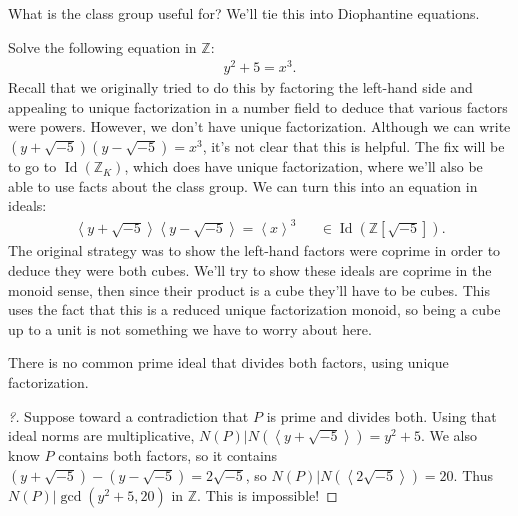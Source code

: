 \begin{remark}

What is the class group useful for? We'll tie this into Diophantine
equations.

\end{remark}

\begin{example}

Solve the following equation in \({\mathbb{Z}}\):
\begin{align*}
y^2 + 5 = x^3
.\end{align*}
Recall that we originally tried to do this by factoring the left-hand
side and appealing to unique factorization in a number field to deduce
that various factors were powers. However, we don't have unique
factorization. Although we can write
\(( y + \sqrt{-5} ) (y - \sqrt{-5} ) = x^3\), it's not clear that this
is helpful. The fix will be to go to
\(\operatorname{Id}({\mathbb{Z}}_K)\), which does have unique
factorization, where we'll also be able to use facts about the class
group. We can turn this into an equation in ideals:
\begin{align*}
\left\langle{ y + \sqrt{-5} }\right\rangle  
\left\langle{ y - \sqrt{-5} }\right\rangle  
= 
\left\langle{ x }\right\rangle^3 && \in \operatorname{Id}({\mathbb{Z}}[\sqrt{-5} ]) 
.\end{align*}
The original strategy was to show the left-hand factors were coprime in
order to deduce they were both cubes. We'll try to show these ideals are
coprime in the monoid sense, then since their product is a cube they'll
have to be cubes. This uses the fact that this is a reduced unique
factorization monoid, so being a cube up to a unit is not something we
have to worry about here.

\begin{claim}

There is no common prime ideal that divides both factors, using unique
factorization.

\end{claim}

\begin{proof}[?]

Suppose toward a contradiction that \(P\) is prime and divides both.
Using that ideal norms are multiplicative,
\(N(P) \mathrel{\Big|}N( \left\langle{ y + \sqrt{-5} }\right\rangle) = y^2 + 5\).
We also know \(P\) contains both factors, so it contains
\((y + \sqrt{-5} ) - (y - \sqrt{-5} ) = 2 \sqrt{-5}\), so
\(N(P) \mathrel{\Big|}N( \left\langle{ 2 \sqrt{-5} }\right\rangle ) = 20\).
Thus \(N(P) \mathrel{\Big|}\gcd(y^2 + 5, 20)\) in \({\mathbb{Z}}\). This
is impossible!


\end{proof}
\end{example}
